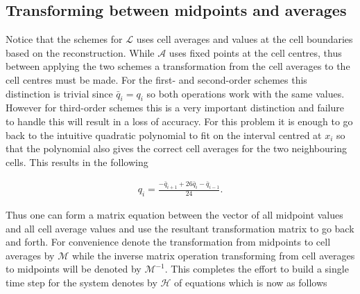 \documentclass[SingleSpace,12pt]{Serre_ASCE}
\begin{document}
\subsection{Transforming between midpoints and averages} %
Notice that the schemes for $\mathcal{L}$ uses cell averages and values at the cell boundaries based on the reconstruction. While $\mathcal{A}$ uses fixed points at the cell centres, thus between applying the two schemes a transformation from the cell averages to the cell centres must be made. For the first- and second-order schemes this distinction is trivial since $\bar{q}_i = q_i$ so both operations work with the same values. However for third-order schemes this is a very important distinction and failure to handle this will result in a loss of accuracy. For this problem it is enough to go back to the intuitive quadratic polynomial to fit on the interval centred at $x_i$ so that the polynomial also gives the correct cell averages for the two neighbouring cells. This results in the following
\begin{linenomath*}
\begin{gather}\label{eq:midtoca}
q_i = \frac{- \bar{q}_{i+1} + 26\bar{q}_{i} - \bar{q}_{i-1}}{24}.
\end{gather}
\end{linenomath*}
Thus one can form a matrix equation between the vector of all midpoint values and all cell average values and use the resultant transformation matrix to go back and forth. For convenience denote the transformation from midpoints to cell averages by $\mathcal{M}$ while the inverse matrix operation transforming from cell averages to midpoints will be denoted by $\mathcal{M}^{-1}$. This completes the effort to build a single time step for the system denotes by $\mathcal{H}$ of equations which is now as follows
\end{document}

